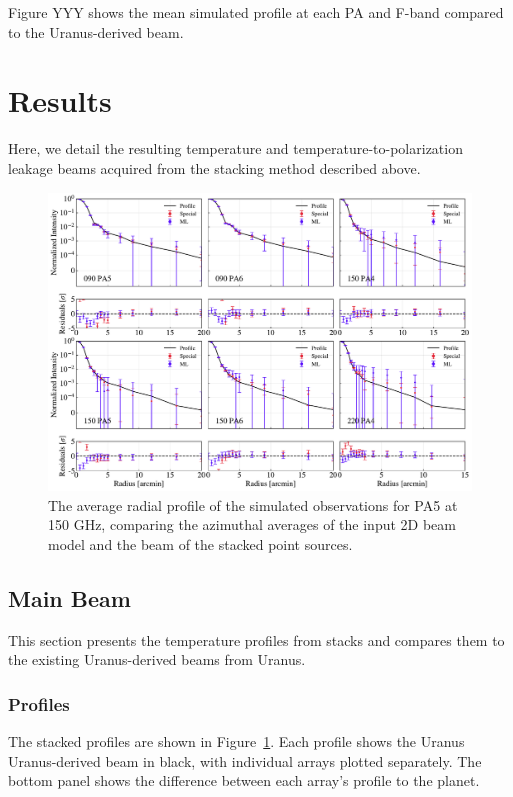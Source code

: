 Figure YYY shows the mean simulated profile at each PA and F-band compared to the Uranus-derived beam.

\section{Results}
\label{sec:act_results}
Here, we detail the resulting temperature and temperature-to-polarization leakage beams acquired from the stacking method described above. 

\begin{figure}[t]
    \centering
    \includegraphics[width=\textwidth]{Figures/profiles_noP_15.pdf}
    \caption{The average radial profile of the simulated observations for PA5 at 150 GHz, comparing the azimuthal averages of the input 2D beam model and the beam of the stacked point sources. 
    }
    \label{fig:profiles}
\end{figure}

\subsection{Main Beam}
\label{subsec:mainbeam}
This section presents the temperature profiles from stacks and compares them to the existing Uranus-derived beams from Uranus. 
\subsubsection{Profiles}
\label{subsubsec:profiles}
The stacked profiles are shown in Figure~\ref{fig:profiles}.  Each profile shows the Uranus Uranus-derived beam in black, with individual arrays plotted separately.  The bottom panel shows the difference between each array's profile to the planet.
